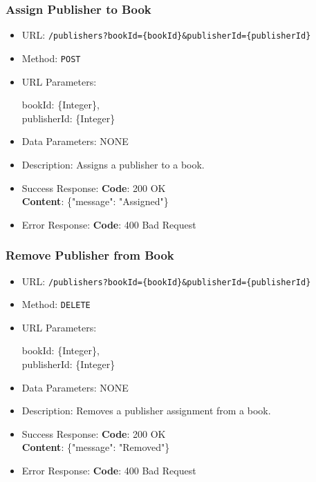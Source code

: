 \subsubsection*{Assign Publisher to Book}

\begin{itemize}
    \item URL: \texttt{/publishers?bookId=\{bookId\}&publisherId=\{publisherId\}}
    \item Method: \texttt{POST}
    \item URL Parameters:

    bookId: \{Integer\}, \\
    publisherId: \{Integer\}

    \item Data Parameters: NONE
    \item Description: Assigns a publisher to a book.

    \item Success Response: \newline
    \textbf{Code}: 200 OK \\
    \textbf{Content}: \{"message": "Assigned"\}

    \item Error Response: \newline
    \textbf{Code}: 400 Bad Request
\end{itemize}

\subsubsection*{Remove Publisher from Book}

\begin{itemize}
    \item URL: \texttt{/publishers?bookId=\{bookId\}&publisherId=\{publisherId\}}
    \item Method: \texttt{DELETE}
    \item URL Parameters:

    bookId: \{Integer\}, \\
    publisherId: \{Integer\}

    \item Data Parameters: NONE
    \item Description: Removes a publisher assignment from a book.

    \item Success Response: \newline
    \textbf{Code}: 200 OK \\
    \textbf{Content}: \{"message": "Removed"\}

    \item Error Response: \newline
    \textbf{Code}: 400 Bad Request
\end{itemize}

